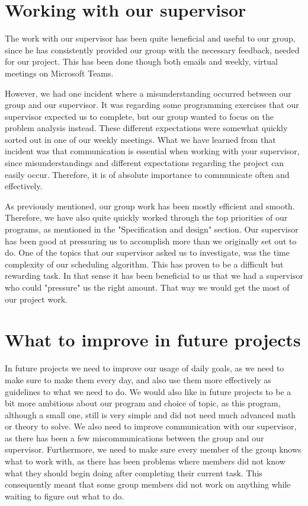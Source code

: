 \section{Working with our supervisor}
The work with our supervisor has been quite beneficial and useful to our group, since he has consistently provided our group with the necessary feedback, needed for our project. This has been done though both emails and weekly, virtual meetings on Microsoft Teams.

However, we had one incident where a misunderstanding occurred between our group and our supervisor. It was regarding some programming exercises that our supervisor expected us to complete, but our group wanted to focus on the problem analysis instead. These different expectations were somewhat quickly sorted out in one of our weekly meetings.
What we have learned from that incident was that communication is essential when working with your supervisor, since misunderstandings and different expectations regarding the project can easily occur. Therefore, it is of absolute importance to communicate often and effectively.

As previously mentioned, our group work has been mostly efficient and smooth. Therefore, we have also quite quickly worked through the top priorities of our programs, as mentioned in the "Specification and design" section. Our supervisor has been good at pressuring us to accomplish more than we originally set out to do. One of the topics that our supervisor asked us to investigate, was the time complexity of our scheduling algorithm. 
This has proven to be a difficult but rewarding task. In that sense it has been beneficial to us that we had a supervisor who could "pressure" us the right amount. That way we would get the most of our project work.

\section{What to improve in future projects}
In future projects we need to improve our usage of daily goals, as we need to make sure to make them every day, and also use them more effectively as guidelines to what we need to do. We would also like in future projects to be a bit more ambitious about our program and choice of topic, as this program, although a small one, still is very simple and did not need much advanced math or theory to solve. We also need to improve communication with our supervisor, as there has been a few miscommunications between the group and our supervisor. Furthermore, we need to make sure every member of the group knows what to work with, as there has been problems where members did not know what they should begin doing after completing their current task. This consequently meant that some group members did not work on anything while waiting to figure out what to do.

